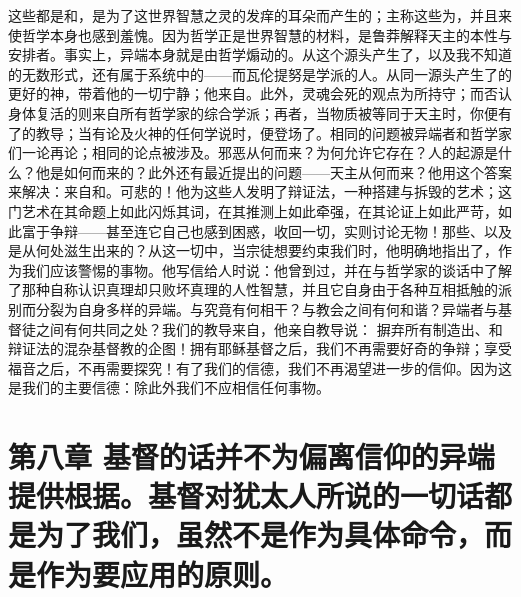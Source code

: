 这些都是和，是为了这世界智慧之灵的发痒的耳朵而产生的；主称这些为，并且来使哲学本身也感到羞愧。因为哲学正是世界智慧的材料，是鲁莽解释天主的本性与安排者。事实上，异端本身就是由哲学煽动的。从这个源头产生了，以及我不知道的无数形式，还有属于系统中的——而瓦伦提努是学派的人。从同一源头产生了的更好的神，带着他的一切宁静；他来自。此外，灵魂会死的观点为所持守；而否认身体复活的则来自所有哲学家的综合学派；再者，当物质被等同于天主时，你便有了的教导；当有论及火神的任何学说时，便登场了。相同的问题被异端者和哲学家们一论再论；相同的论点被涉及。邪恶从何而来？为何允许它存在？人的起源是什么？他是如何而来的？此外还有最近提出的问题——天主从何而来？他用这个答案来解决：来自和。可悲的！他为这些人发明了辩证法，一种搭建与拆毁的艺术；这门艺术在其命题上如此闪烁其词，在其推测上如此牵强，在其论证上如此严苛，如此富于争辩——甚至连它自己也感到困惑，收回一切，实则讨论无物！那些、以及是从何处滋生出来的？从这一切中，当宗徒想要约束我们时，他明确地指出了，作为我们应该警惕的事物。他写信给人时说：他曾到过，并在与哲学家的谈话中了解了那种自称认识真理却只败坏真理的人性智慧，并且它自身由于各种互相抵触的派别而分裂为自身多样的异端。与究竟有何相干？与教会之间有何和谐？异端者与基督徒之间有何共同之处？我们的教导来自，他亲自教导说： 摒弃所有制造出、和辩证法的混杂基督教的企图！拥有耶稣基督之后，我们不再需要好奇的争辩；享受福音之后，不再需要探究！有了我们的信德，我们不再渴望进一步的信仰。因为这是我们的主要信德：除此外我们不应相信任何事物。\par


\section{第八章 基督的话并不为偏离信仰的异端提供根据。基督对犹太人所说的一切话都是为了我们，虽然不是作为具体命令，而是作为要应用的原则。}

